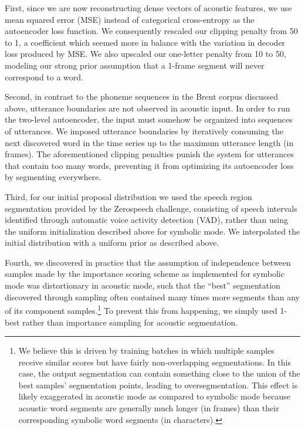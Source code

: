 \documentclass[11pt,letterpaper]{article}
\begin{document}
First, since we are now reconstructing dense vectors of acoustic features, we use mean squared error (MSE) instead of categorical cross-entropy as the autoencoder loss function.
We consequently rescaled our clipping penalty from 50 to 1, a coefficient which seemed more in balance with the variation in decoder loss produced by MSE.
We also upscaled our one-letter penalty from 10 to 50, modeling our strong prior assumption that a 1-frame segment will never correspond to a word.

Second, in contrast to the phoneme sequences in the Brent corpus discussed above, utterance boundaries are not observed in acoustic input.
In order to run the two-level autoencoder, the input must somehow be organized into sequences of utterances.
We imposed utterance boundaries by iteratively consuming the next discovered word in the time series up to the maximum utterance length (in frames).
The aforementioned clipping penalties punish the system for utterances that contain too many words, preventing it from optimizing its autoencoder loss by segmenting everywhere.

Third, for our initial proposal distribution we used the speech region segmentation provided by the Zerospeech challenge, consisting of speech intervals identified through automatic voice activity detection (VAD), rather than using the uniform initialization described above for symbolic mode.
We interpolated the initial distribution with a uniform prior as described above.

Fourth, we discovered in practice that the assumption of independence between samples made by the importance scoring scheme as implemented for symbolic mode was distortionary in acoustic mode, such that the ``best'' segmentation discovered through sampling often contained many times more segments than any of its component samples.\footnote{We believe this is driven by training batches in which multiple samples receive similar scores but have fairly non-overlapping segmentations.
In this case, the output segmentation can contain something close to the union of the best samples' segmentation points, leading to oversegmentation.
This effect is likely exaggerated in acoustic mode as compared to symbolic mode because acoustic word segments are generally much longer (in frames) than their corresponding symbolic word segments (in characters).}
To prevent this from happening, we simply used 1-best rather than importance sampling for acoustic segmentation.
\end{document}
